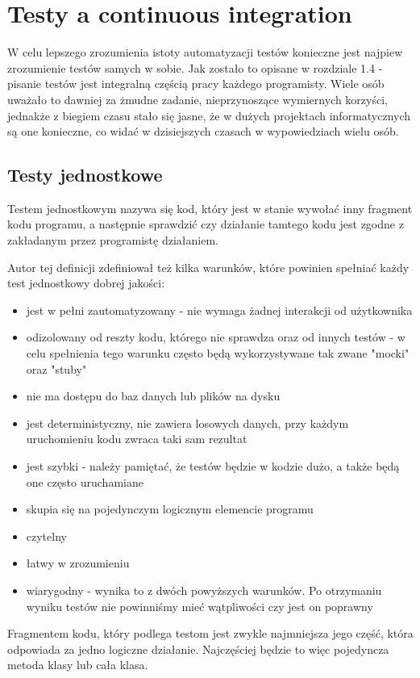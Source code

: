 \section{Testy a continuous integration}
W celu lepszego zrozumienia istoty automatyzacji testów konieczne jest najpiew zrozumienie testów samych w sobie. Jak zostało to opisane w rozdziale 1.4 - pisanie testów jest integralną częścią pracy każdego programisty. Wiele osób uważało to dawniej za żmudne zadanie, nieprzynoszące wymiernych korzyści, jednakże z biegiem czasu stało się jasne, że w dużych projektach informatycznych są one konieczne, co widać w dzisiejszych czasach w wypowiedziach wielu osób. \cite{UnitOpinions} \cite{UnitResults}

\subsection{Testy jednostkowe}
Testem jednostkowym nazywa się kod, który jest w stanie wywołać inny fragment kodu programu, a następnie sprawdzić czy działanie tamtego kodu jest zgodne z zakładanym przez programistę działaniem. \cite{UnitDefinition}
\par Autor tej definicji zdefiniował też kilka warunków, które powinien spełniać każdy test jednostkowy dobrej jakości: 
\begin{itemize}
    \item jest w pełni zautomatyzowany - nie wymaga żadnej interakcji od użytkownika
    \item odizolowany od reszty kodu, którego nie sprawdza oraz od innych testów - w celu spełnienia tego warunku często będą wykorzystywane tak zwane "mocki" oraz "stuby" 
    \item nie ma dostępu do baz danych lub plików na dysku
    \item jest deterministyczny, nie zawiera losowych danych, przy każdym uruchomieniu kodu zwraca taki sam rezultat
    \item jest szybki - należy pamiętać, że testów będzie w kodzie dużo, a także będą one często uruchamiane
    \item skupia się na pojedynczym logicznym elemencie programu
    \item czytelny
    \item łatwy w zrozumieniu
    \item wiarygodny - wynika to z dwóch powyższych warunków. Po otrzymaniu wyniku testów nie powinniśmy mieć wątpliwości czy jest on poprawny
\end{itemize}
Fragmentem kodu, który podlega testom jest zwykle najmniejsza jego część, która odpowiada za jedno logiczne działanie. Najczęściej będzie to więc pojedyncza metoda klasy lub cała klasa. 

